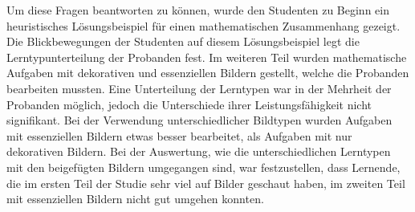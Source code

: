 Um diese Fragen beantworten zu können, wurde den Studenten zu Beginn ein heuristisches Lösungsbeispiel für einen mathematischen Zusammenhang gezeigt. Die Blickbewegungen der Studenten auf diesem Lösungsbeispiel legt die Lerntypunterteilung der Probanden fest. Im weiteren Teil wurden mathematische Aufgaben mit dekorativen und essenziellen Bildern gestellt, welche die Probanden bearbeiten mussten. Eine Unterteilung der Lerntypen war in der Mehrheit der Probanden möglich, jedoch die Unterschiede ihrer Leistungsfähigkeit nicht signifikant. Bei der Verwendung unterschiedlicher Bildtypen wurden Aufgaben mit essenziellen Bildern etwas besser bearbeitet, als Aufgaben mit nur dekorativen Bildern. Bei der Auswertung, wie die unterschiedlichen Lerntypen mit den beigefügten Bildern umgegangen sind, war festzustellen, dass Lernende, die im ersten Teil der Studie sehr viel auf Bilder geschaut haben, im zweiten Teil mit essenziellen Bildern nicht gut umgehen konnten.


\tableofcontents %










\printbibliography
\clearpage

\listoffigures %

\printacronyms[title={Abkürzungsverzeichnis}] %

\listoftables %

\onehalfspacing
